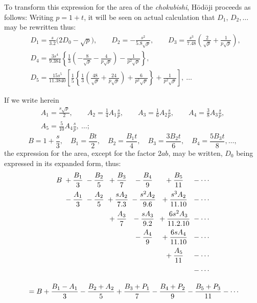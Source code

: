 \documentclass[11pt]{article}
\begin{document}
To transform this expression for the area of the \emph{chokubishi}, Hōdōji proceeds as follows: Writing $p=1+t$, it will be seen on actual calculation that $D_1$, $D_2,\ldots$ may be rewritten thus:
\[
\begin{aligned}
&D_1=\frac{s}{3.2}\bigl(2D_0-\sqrt{p}\bigr),\qquad D_2=-\frac{s^2}{5.8\sqrt{p}},\qquad D_3=\frac{s^3}{7.48}\left(\frac{2}{\sqrt{p}}+\frac{1}{p\sqrt{p}}\right),\\
&D_4=\frac{3s^4}{9.384}\left\{\frac{1}{3}\left(-\frac{8}{\sqrt{p}}-\frac{4}{p\sqrt{p}}\right)-\frac{1}{p^2\sqrt{p}}\right\},\\
&D_5=\frac{15s^5}{11.3840}\left[\frac{1}{5}\left\{\frac{1}{3}\left(\frac{48}{\sqrt{p}}+\frac{24}{p\sqrt{p}}\right)+\frac{6}{p^2\sqrt{p}}\right\}+\frac{1}{p^2\sqrt{p}}\text{}\right],\ \ldots
\end{aligned}
\]

If we write herein
\begin{multline*}
A_1=\frac{s\sqrt{p}}{2},\qquad A_2=\frac{1}{4}A_1\frac{s}{p},\qquad A_3=\frac{1}{6}A_2\frac{s}{p},\qquad A_4=\frac{3}{8}A_3\frac{s}{p},\\
A_5=\frac{5}{10}A_4\frac{s}{p},\ \ldots;
\end{multline*}
\[
B=1+\frac{s}{3},\quad B_1=\frac{Bt}{2},\quad B_2=\frac{B_1t}{4},\quad B_3=\frac{3B_2t}{6},\quad B_4=\frac{5B_3t}{8},\ldots,
\]
the expression for the area, except for the factor $2ab$, may be written, $D_0$ being expressed in its expanded form, thus:
\begin{gather*}
\begin{array}{r@{\;}c@{\;}c@{\;}c@{\;}c@{\;}c@{\;}l}
B & {}+\dfrac{B_1}{3} & {}-\dfrac{B_2}{5} & {}+\dfrac{B_3}{7} & {}-\dfrac{B_4}{9} & {}+\dfrac{B_5}{11} & {}-\cdots\\[3mm]
 & {}-\dfrac{A_1}{3} & {}-\dfrac{A_2}{5} & {}+\dfrac{sA_2}{7.3} & {}-\dfrac{s^2A_2}{9.6} & {}+\dfrac{s^3A_2}{11.10} & {}-\cdots\\[3mm]
 & & & {}+\dfrac{A_3}{7} & {}-\dfrac{sA_3}{9.2} & {}+\dfrac{6s^2A_3}{11.2.10} & {}-\cdots\\[3mm]
 & & & & {}-\dfrac{A_4}{9} & {}+\dfrac{6sA_4}{11.10} & {}-\cdots\\[3mm]
 & & & & & {}+\dfrac{A_5}{11} & {}-\cdots\\[3mm]
 & & & & & & {}-\cdots
\end{array}\\[3mm]
{}=B+\frac{B_1-A_1}{3}-\frac{B_2+A_2}{5}+\frac{B_3+P_1}{7}-\frac{B_4+P_2}{9}-\frac{B_5+P_3}{11}-\cdots
\end{gather*}
\end{document}

